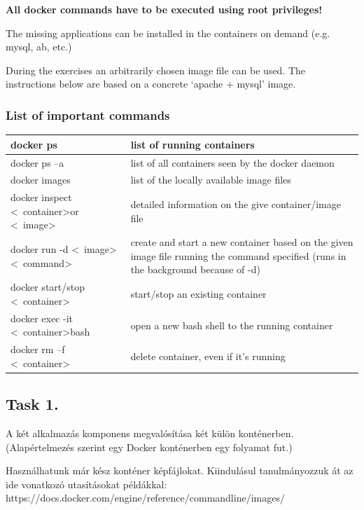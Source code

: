 \documentclass[a4paper]{article}
\begin{document}
\textbf{All docker commands have to be executed using root privileges!}

The missing applications can be installed in the containers on demand (e.g. mysql, ab, etc.)

During the exercises an arbitrarily chosen image file can be used. The instructions below are based on a concrete `apache + mysql' image.

\subsubsection{List of important commands}
\begin{table}[h]
\begin{tabularx}{\textwidth}{|l|X|}
\hline docker ps & list of running containers \\
\hline docker ps –a &  list of all containers seen by the docker daemon \\
\hline docker images  &  list of the locally available image files \\
\hline docker inspect \textless~container\textgreater or \textless~image\textgreater  &  detailed information on the give container/image file \\
\hline docker run -d \textless~image\textgreater \textless~command\textgreater &  create and start a new container based on the given image file running the command specified (runs in the background because of -d) \\
\hline docker start/stop \textless~container\textgreater  &  start/stop an existing container \\
\hline docker exec -it \textless~container\textgreater bash & open a new bash shell to the running container \\
\hline docker rm –f \textless~container\textgreater  &  delete container, even if it's running \\
\hline
\end{tabularx}
\end{table}

\subsection{Task 1.}
A két alkalmazás komponens megvalósítása két külön konténerben. (Alapértelmezés szerint egy Docker konténerben egy folyamat fut.)

Használhatunk már kész konténer képfájlokat. Kiindulásul tanulmányozzuk át az ide vonatkozó utasításokat példákkal: https://docs.docker.com/engine/reference/commandline/images/
\end{document}
